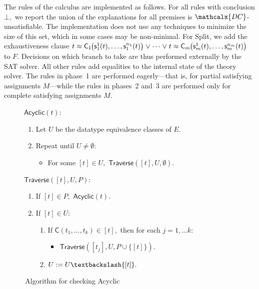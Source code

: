 \documentclass[smallcondensed,draft]{svjour3}
\newcommand\DISC[1]{t \teq \const{C}_{#1}\negvthinspace\bigl(\const s^1_{#1}( t ), \ldots,\const s^{n_{#1}}_{#1}( t )\bigr)}
\newcommand\const[1]{\textsf{#1}}
\newcommand{\Ec}{E}
\newcommand{\rn}[1]{\textsf{#1}}
\newcommand{\teq}{\approx}
\newcommand{\ec}[1]{[#1]}
\newcommand{\thD}{\mathcalx{DC}}
\newcommand\negvthinspace{\kern-0.083333em}
\begin{document}
The rules of the calculus are implemented as follows. For all rules with
conclusion $\bot,$ we report the union of the explanations for all premises is
$\thD$-unsatisfiable. The implementation does not
use any techniques to minimize the size of this set, which in some cases may be non-minimal.
For \rn{Split}, we add the exhaustiveness clause %
$\DISC{1} \mathrel\lor \cdots \mathrel\lor \DISC{m}$ to $F.$
Decisions on which branch to take are thus performed externally by the SAT
solver. %
All other rules add equalities to the
internal state of the theory solver. The rules in phase~1 are performed
eagerly---that is, for partial satisfying assignments $M$---while the rules in
phases~2 and~3 are performed only for complete satisfying
assignments $M.$

\begin{figure}[t!]
\normalsize
\centering
\flushleft $\rn{Acyclic}(t)$:

\vspace*{-\topsep}

\begin{enumerate}
\item Let $U$ be the datatype equivalence classes of $\Ec.$
\item Repeat until $U \neq \emptyset$:
\begin{itemize}
\item[\ ] For some $\ec{t} \in U,$ $\rn{Traverse}( \ec{t}, U, \emptyset ).$
\end{itemize}
\end{enumerate}

\flushleft $\rn{Traverse}( \ec{t}, U, P )$:

\vspace*{-\topsep}

\begin{enumerate}
\item If $\ec{t} \in P,$ $\rn{Acyclic}(t).$
\item If $\ec{t} \in U$:
\begin{enumerate}
\item[2.1.] If $\const{C}( t_1, \ldots, t_k ) \in \ec{t},$ then for each $j = 1, \ldots k$:
\begin{itemize}
\item[2.1.1.] $\rn{Traverse}( \ec{t_j}, U, P \cup \{ \ec{t} \} ).$
\end{itemize}
\item[2.2.] $U := U \textbackslash \{ \ec{t} \}.$
\end{enumerate}
\end{enumerate}
\vspace*{-\topsep}
\caption{\,Algorithm for checking \rn{Acyclic}}
\label{fig:acyclic-algo}
\end{figure}
\end{document}
